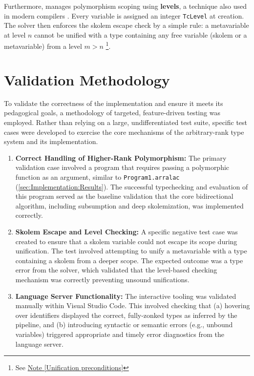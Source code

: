 Furthermore, \Arralac manages polymorphism scoping using \textbf{levels}, a technique also used in modern compilers \cite{practical-type-inference-with-levels-2025}. Every variable is assigned an integer \texttt{TcLevel} at creation. The solver then enforces the skolem escape check by a simple rule: a metavariable at level $n$ cannot be unified with a type containing any free variable (skolem or a metavariable) from a level $m > n$ \footnote{See \href{https://github.com/ghc/ghc/blob/ed38c09bd89307a7d3f219e1965a0d9743d0ca73/compiler/GHC/Tc/Utils/Unify.hs\#L2589}{Note [Unification preconditions]}}.

\section{Validation Methodology}
\label{sec:Implementation:Methodology}

To validate the correctness of the implementation and ensure it meets its pedagogical goals, a methodology of targeted, feature-driven testing was employed. Rather than relying on a large, undifferentiated test suite, specific test cases were developed to exercise the core mechanisms of the arbitrary-rank type system and its implementation.

\begin{enumerate}
    \item \textbf{Correct Handling of Higher-Rank Polymorphism:} The primary validation case involved a program that requires passing a polymorphic function as an argument, similar to \texttt{Program1.arralac} (\cref{sec:Implementation:Results}). The successful typechecking and evaluation of this program served as the baseline validation that the core bidirectional algorithm, including subsumption and deep skolemization, was implemented correctly.

    \item \textbf{Skolem Escape and Level Checking:} A specific negative test case was created to ensure that a skolem variable could not escape its scope during unification. The test involved attempting to unify a metavariable with a type containing a skolem from a deeper scope. The expected outcome was a type error from the solver, which validated that the level-based checking mechanism was correctly preventing unsound unifications.

    \item \textbf{Language Server Functionality:} The interactive tooling was validated manually within Visual Studio Code. This involved checking that (a) hovering over identifiers displayed the correct, fully-zonked types as inferred by the pipeline, and (b) introducing syntactic or semantic errors (e.g., unbound variables) triggered appropriate and timely error diagnostics from the language server.
\end{enumerate}

